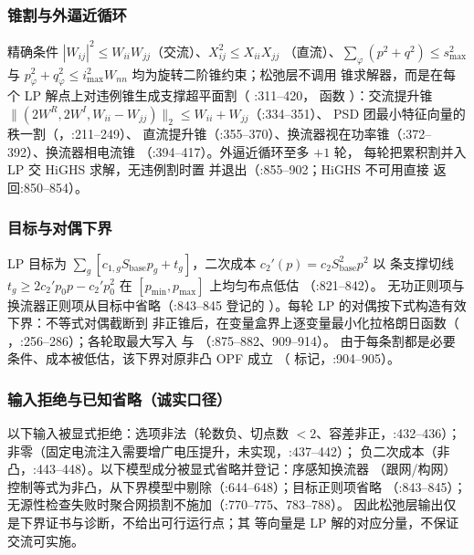 \subsubsection*{锥割与外逼近循环}
精确条件 $|W_{ij}|^2\le W_{ii}W_{jj}$（交流）、$X_{ij}^2\le X_{ii}X_{jj}$
（直流）、$\sum_\varphi(p^2+q^2)\le s_{\max}^2$ 与
$p_\varphi^2+q_\varphi^2\le i_{\max}^2 W_{nn}$ 均为旋转二阶锥约束；松弛层不调用
锥求解器，而是在每个 LP 解点上对违例锥生成支撑超平面割（
:311--420，
函数 ）：交流提升锥
$\lVert(2W^{R},2W^{I},W_{ii}-W_{jj})\rVert_2\le W_{ii}+W_{jj}$（:334--351）、
PSD 团最小特征向量的秩一割（，:211--249）、
直流提升锥（:355--370）、换流器视在功率锥（:372--392）、换流器相电流锥
（:394--417）。外逼近循环至多 $+1$ 轮，
每轮把累积割并入 LP 交 HiGHS 求解，无违例割时置
 并退出（:855--902；HiGHS 不可用直接
返回:850--854）。

\subsubsection*{目标与对偶下界}
LP 目标为 $\sum_g[c_{1,g}S_{\mathrm{base}}p_g + t_g]$，二次成本
$c_2'(p)=c_2S_{\mathrm{base}}^2p^2$ 以  条支撑切线
$t_g\ge 2c_2'p_0p-c_2'p_0^2$ 在 $[p_{\min},p_{\max}]$ 上均匀布点低估
（:821--842）。
无功正则项与换流器正则项从目标中省略（:843--845 登记的
）。每轮 LP 的对偶按下式构造有效下界：不等式对偶截断到
非正锥后，在变量盒界上逐变量最小化拉格朗日函数（
，:256--286）；各轮取最大写入
 与 （:875--882、909--914）。
由于每条割都是必要条件、成本被低估，该下界对原非凸 OPF 成立
（ 标记，:904--905）。

\subsubsection*{输入拒绝与已知省略（诚实口径）}
以下输入被显式拒绝：选项非法（轮数负、切点数 $<2$、容差非正，:432--436）；
 非零（固定电流注入需要增广电压提升，未实现，:437--442）；
负二次成本（非凸，:443--448）。以下模型成分被显式省略并登记：序感知换流器
（跟网/构网）控制等式为非凸，从下界模型中剔除（:644--648）；目标正则项省略
（:843--845）；无源性检查失败时聚合网损割不施加（:770--775、783--788）。
因此松弛层输出仅是下界证书与诊断，不给出可行运行点；其
 等向量是 LP 解的对应分量，不保证交流可实施。

